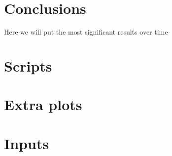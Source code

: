 \documentclass[11pt,letterpaper]{report}
\begin{document}
	
	
	
	
	\chapter{Conclusions}
	Here we will put the most significant results over time
	
	
	
	
	\appendix
	
	\chapter[Scripts]{Scripts}
	
	\chapter{Extra plots}
	
	\chapter{Inputs}
	
\end{document}
